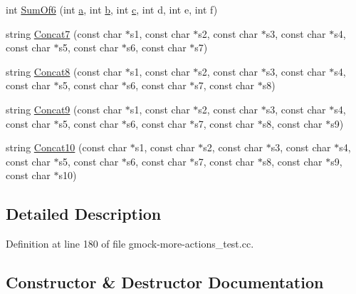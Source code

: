 \begin{DoxyCompactItemize}
\item 
int \hyperlink{classtesting_1_1gmock__more__actions__test_1_1_foo_a34b5ae7cd4620331af92c637e3534bc4}{Sum\+Of6} (int \hyperlink{_07copy_08_2_read_camera_model_8m_a551a3d351eadcc0b9b1a2f24f0fb5ea0}{a}, int \hyperlink{jquery_8js_a2fa551895933fae935a0a6b87282241d}{b}, int \hyperlink{jquery_8js_abce695e0af988ece0826d9ad59b8160d}{c}, int d, int e, int f)
\item 
string \hyperlink{classtesting_1_1gmock__more__actions__test_1_1_foo_a267eab73377069cdd153f351e577ec01}{Concat7} (const char $\ast$s1, const char $\ast$s2, const char $\ast$s3, const char $\ast$s4, const char $\ast$s5, const char $\ast$s6, const char $\ast$s7)
\item 
string \hyperlink{classtesting_1_1gmock__more__actions__test_1_1_foo_a8457ede63aec737d6e7c42b3c11b993a}{Concat8} (const char $\ast$s1, const char $\ast$s2, const char $\ast$s3, const char $\ast$s4, const char $\ast$s5, const char $\ast$s6, const char $\ast$s7, const char $\ast$s8)
\item 
string \hyperlink{classtesting_1_1gmock__more__actions__test_1_1_foo_a96946ff77b6fa4f1d333592bc18e37e4}{Concat9} (const char $\ast$s1, const char $\ast$s2, const char $\ast$s3, const char $\ast$s4, const char $\ast$s5, const char $\ast$s6, const char $\ast$s7, const char $\ast$s8, const char $\ast$s9)
\item 
string \hyperlink{classtesting_1_1gmock__more__actions__test_1_1_foo_ac9c9711d423f0125fb46f468a04862fd}{Concat10} (const char $\ast$s1, const char $\ast$s2, const char $\ast$s3, const char $\ast$s4, const char $\ast$s5, const char $\ast$s6, const char $\ast$s7, const char $\ast$s8, const char $\ast$s9, const char $\ast$s10)
\end{DoxyCompactItemize}


\subsection{Detailed Description}


Definition at line 180 of file gmock-\/more-\/actions\+\_\+test.\+cc.



\subsection{Constructor \& Destructor Documentation}
